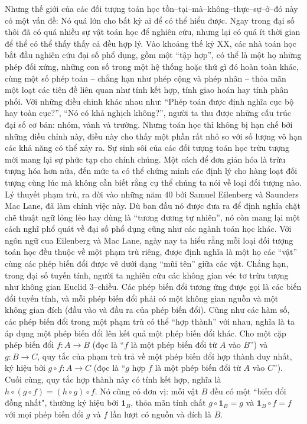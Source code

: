 \begin{multicols}{2}
\begin{figure}[H]
		\vspace*{-10pt}
	\end{figure}
	Nhưng thế giới của các đối tượng toán học tồn--tại--mà--không--thực--sự--ở--đó này có một vấn đề: Nó quá lớn cho bất kỳ ai để có thể hiểu được. Ngay trong đại số thôi đã có quá nhiều sự vật toán học để nghiên cứu, nhưng lại có quá ít thời gian để thể có thể thấy thấy cả đều hợp lý. Vào khoảng thế kỷ XX, các nhà toán học bắt đầu nghiên cứu đại số phổ dụng,  gồm một ``tập hợp'', có thể là một họ những phép đối xứng, những con số trong một hệ thống hoặc thứ gì đó hoàn toàn khác, cùng một số phép toán -- chẳng hạn như phép cộng và phép nhân -- thỏa mãn một loạt các tiên đề liên quan như tính kết hợp, tính giao hoán hay tính phân phối. Với những điều chỉnh khác nhau như: ``Phép toán được định nghĩa cục bộ hay toàn cục?'', ``Nó có khả nghịch không?'', người ta thu được những cấu trúc đại số cơ bản: nhóm, vành và trường. Nhưng toán học thì không bị hạn chế bởi những điều chỉnh này, điều này cho thấy một phần rất nhỏ so với số lượng vô hạn các khả năng có thể xảy ra.
	\vskip 0.1cm
	Sự sinh sôi của các đối tượng toán học trừu tượng mới mang lại sự phức tạp cho chính chúng. Một cách để đơn giản hóa là trừu tượng hóa hơn nữa, đến mức ta có thể chứng minh các định lý cho hàng loạt đối tượng cùng lúc mà không cần biết rằng cụ thể chúng ta nói về loại đối tượng nào.
	\vskip 0.1cm
	Lý thuyết phạm trù, ra đời vào những năm $40$ bởi Samuel Eilenberg và Saunders Mac Lane, đã làm chính việc này. Dù ban đầu nó được đưa ra để định nghĩa chặt chẽ thuật ngữ lỏng lẻo hay dùng là ``tương đương tự nhiên'', nó còn mang lại một cách nghĩ phổ quát về đại số phổ dụng cũng như các ngành toán học khác. Với ngôn ngữ cua Eilenberg và Mac Lane, ngày nay ta hiểu rằng mỗi loại đối tượng toán học đều thuộc về một phạm trù riêng, được định nghĩa là một họ các ``vật'' cùng các phép biến đổi được vẽ dưới dạng ``mũi tên'' giữa các vật. Chẳng hạn, trong đại số tuyến tính, người ta nghiên cứu các không gian véc tơ trừu tượng như không gian Euclid $3$--chiều. Các phép biến đổi tương ứng được gọi là các biến đổi tuyến tính, và mỗi phép biến đổi phải có một không gian nguồn và một không gian đích (đầu vào và đầu ra của phép biến đổi). Cũng như các hàm số, các phép biến đổi trong một phạm trù có thể ``hợp thành'' với nhau, nghĩa là ta áp dụng một phép biến đổi lên kết quả một phép biến đổi khác. Cho một cặp phép biến đổi $f: A \to B$ (đọc là ``$f$ là một phép biến đổi từ $A$ vào $B$'') và $g: B \to C$, quy tắc của phạm trù trả về một phép biến đổi hợp thành duy nhất, ký hiệu bởi $g \circ f: A \to C$ (đọc là ``$g$ hợp $f$ là một phép biến đổi từ $A$ vào $C$''). Cuối cùng, quy tắc hợp thành này có tính kết hợp, nghĩa là $h \circ (g \circ f) = (h \circ g) \circ f$. Nó cũng có đơn vị: mỗi vật $B$ đều có một ``biến đổi đồng nhất", thường ký hiệu bởi $\pmb{1}_B$, thỏa mãn tính chất $g \!\circ\! \pmb{1}_B \!=\! g$ và $\pmb{1}_B \!\circ\! f \!=\! f$ với mọi phép biến đổi $g$ và $f$ lần lượt có nguồn và đích là $B$. 

\end{multicols}
